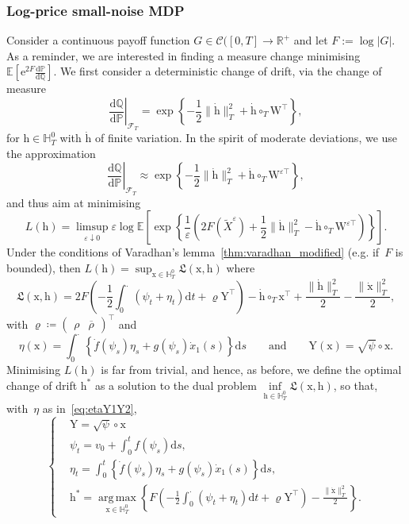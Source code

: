 \documentclass{amsart}[11pt]
\numberwithin{equation}{section}
\numberwithin{theorem}{subsection}
\numberwithin{proposition}{subsection}
\numberwithin{definition}{subsection}
\numberwithin{lemma}{subsection}
\numberwithin{assumption}{subsection}
\newcommand{\Cc}{\mathcal{C}}
\newcommand{\Ff}{\mathcal{F}}
\newcommand{\HH}{\mathbb{H}}
\newcommand{\PP}{\mathbb{P}}
\newcommand{\QQ}{\mathbb{Q}}
\newcommand{\RR}{\mathbb{R}}
\newcommand{\Lf}{\mathfrak{L}}
\newcommand{\R}{\RR}
\newcommand{\EE}{\mathbb{E}}
\newcommand{\cT}{\circ_{T}}
\newcommand{\Wf}{\boldsymbol{\mathrm{W}}}
\newcommand{\Yf}{\boldsymbol{\mathrm{Y}}}
\newcommand{\vrho}{\boldsymbol{\mathrm{\varrho}}}
\newcommand{\brho}{\overline{\rho}}
\newcommand{\D}{\mathrm{d}}
\newcommand{\E}{\mathrm{e}}
\newcommand{\eps}{\varepsilon}
\newcommand{\hh}{\boldsymbol{\mathrm{h}}}
\newcommand{\xx}{\boldsymbol{\mathrm{x}}}
\DeclareMathOperator*{\argmax}{arg\,max}
\begin{document}
\subsubsection{Log-price small-noise MDP}
Consider a continuous payoff function $G\in\Cc([0,T]\to\R^{+}$ and let $F:=\log|G|$. 
As a reminder, we are interested in finding a measure change minimising $\EE[\E^{2F}\frac{\D\PP}{\D\QQ}]$.
We first consider a deterministic change of drift, via the change of measure 
\[
\left.\frac{\D\QQ}{\D\PP}\right\vert_{\Ff_T} = \exp\left\{-\frac{1}{2}\|\dot{\hh}\|_{T}^2 + \dot{\hh}\cT \Wf^\top\right\},
\]
for $\hh \in \HH_T^0$ with $\dot{\hh}$ of finite variation. 
In the spirit of moderate deviations, we use the approximation 
\[
\left.\frac{\D\QQ}{\D\PP}\right\vert_{\Ff_T} \approx \exp\left\{-\frac{1}{2}\|\dot{\hh}\|_{T}^2 + \dot{\hh}\cT \Wf^{\eps\top}\right\},
\]
and thus aim at minimising
\[
L(\hh) = \limsup\limits_{\eps \downarrow 0} \eps\log\EE\left[\exp\left\{\frac{1}{\eps}\left(
2F(\widetilde{X}^\eps) + \frac{1}{2}\|\dot{\hh}\|_{T}^2 - \dot{\hh}\cT \Wf^{\eps\top}\right)\right\}\right].
\]
Under the conditions of Varadhan's lemma~\ref{thm:varadhan_modified} (e.g. if~$F$ is bounded), then
$L(\hh) = 
\sup_{\xx \in \HH_T^0} 
\Lf(\xx,\hh)$
where
$$
\Lf(\xx,\hh)
 = 2 F\left(-\frac{1}{2}\int_0^.(\psi_t + \eta_t)\D t + \vrho\Yf^\top \right) - \dot{\hh}\cT\xx^\top + \frac{\|\dot{\hh}\|_{T}^2}{2} - \frac{\|\dot{\xx}\|_{T}^2}{2},
 $$
with $\vrho \coloneqq \begin{pmatrix}\rho &\brho\end{pmatrix}^\top$ and 
\begin{equation}\label{eq:etaY1Y2}
\eta(\xx) = \int_{0}^{\cdot}\left\{\dot{f}(\psi_s)\eta_s + g(\psi_s)\dot{x}_1(s)\right\}\D s
\qquad\text{and}\qquad
\Yf(\xx) = \sqrt{\psi}\circ \xx.
\end{equation}
Minimising $L(\hh)$ is far from trivial, 
and hence, as before, we define the optimal change of drift $\hh^{*}$ as a solution to the dual problem
$\inf\limits_{\hh \in \HH_T^0} \Lf(\xx,\hh)$,
so that, with~$\eta$ as in~\eqref{eq:etaY1Y2},
\begin{equation}\label{eq:optidetdrift}
\begin{cases}
&\displaystyle \Yf = \sqrt{\psi}\circ \xx \\
&\displaystyle \psi_t = v_0 + \int_0^t f(\psi_s)\D s, \\
&\displaystyle \eta_t = \int_0^t\left\{\dot{f}(\psi_s)\eta_s + g(\psi_s)\dot{x}_1(s)\right\}\D s, \\
&\displaystyle \hh^{*} = \argmax\limits_{\xx \in \HH_T^0} \left\{F\left(-\frac{1}{2}\int_{0}^{\cdot}(\psi_t + \eta_t)\D t + \vrho\Yf^\top\right)- \frac{\|\dot{\xx}\|_{T}^2}{2}\right\}.
\end{cases}
\end{equation}
\end{document}

